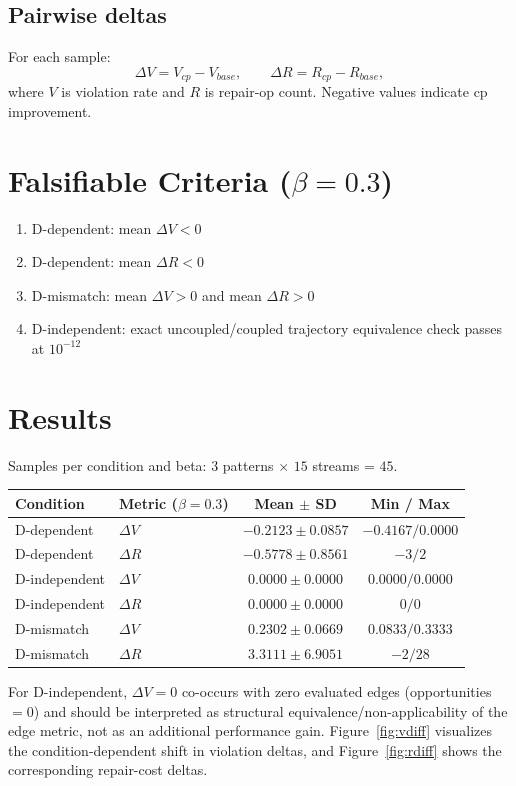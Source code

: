 \documentclass[11pt,a4paper]{article}
\begin{document}
\subsection{Pairwise deltas}
For each sample:
\[
\Delta V = V_{cp} - V_{base},\qquad
\Delta R = R_{cp} - R_{base},
\]
where \(V\) is violation rate and \(R\) is repair-op count.
Negative values indicate cp improvement.

\section{Falsifiable Criteria (\(\beta=0.3\))}
\begin{enumerate}
  \item D-dependent: mean \(\Delta V < 0\)
  \item D-dependent: mean \(\Delta R < 0\)
  \item D-mismatch: mean \(\Delta V > 0\) and mean \(\Delta R > 0\)
  \item D-independent: exact uncoupled/coupled trajectory equivalence check passes at \(10^{-12}\)
\end{enumerate}

\section{Results}
Samples per condition and beta: \(3\) patterns \(\times\) \(15\) streams = \(45\).

\begin{center}
\begin{tabular}{@{}llcc@{}}
\toprule
Condition & Metric (\(\beta=0.3\)) & Mean $\pm$ SD & Min / Max \\
\midrule
D-dependent & $\Delta V$ & $-0.2123 \pm 0.0857$ & $-0.4167 / 0.0000$ \\
D-dependent & $\Delta R$ & $-0.5778 \pm 0.8561$ & $-3 / 2$ \\
D-independent & $\Delta V$ & $0.0000 \pm 0.0000$ & $0.0000 / 0.0000$ \\
D-independent & $\Delta R$ & $0.0000 \pm 0.0000$ & $0 / 0$ \\
D-mismatch & $\Delta V$ & $0.2302 \pm 0.0669$ & $0.0833 / 0.3333$ \\
D-mismatch & $\Delta R$ & $3.3111 \pm 6.9051$ & $-2 / 28$ \\
\bottomrule
\end{tabular}
\end{center}
For D-independent, \(\Delta V=0\) co-occurs with zero evaluated edges (opportunities \(=0\)) and should be interpreted as structural equivalence/non-applicability of the edge metric, not as an additional performance gain.
Figure~\ref{fig:vdiff} visualizes the condition-dependent shift in violation deltas, and Figure~\ref{fig:rdiff} shows the corresponding repair-cost deltas.
\end{document}
